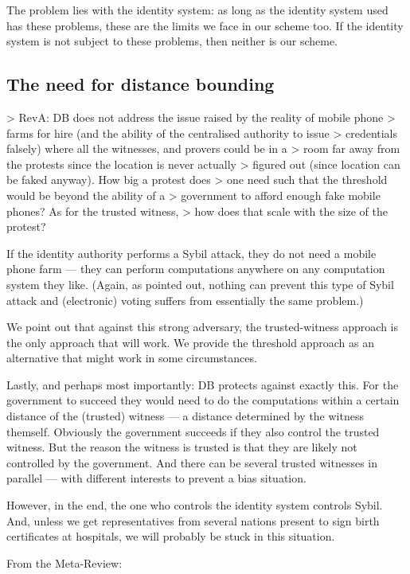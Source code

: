 The problem lies with the identity system: as long as the identity 
system used has these problems, these are the limits we face in our 
scheme too. If the identity system is not subject to these problems, 
then neither is our scheme.


\subsection{The need for distance bounding}

> RevA: DB does not address the issue raised by the reality of mobile phone
> farms for hire (and the ability of the centralised authority to issue
> credentials falsely) where all the witnesses, and provers could be in a
> room far away from the protests since the location is never actually
> figured out (since location can be faked anyway). How big a protest does
> one need such that the threshold would be beyond the ability of a
> government to afford enough fake mobile phones? As for the trusted witness,
> how does that scale with the size of the protest?

If the identity authority performs a Sybil attack, they 
do not need a mobile phone farm --- they can perform computations 
anywhere on any computation system they like. (Again, as pointed out, 
nothing can prevent this type of Sybil attack and (electronic) voting 
suffers from essentially the same problem.)

We point out that against this strong adversary, the 
trusted-witness approach is the only approach that will work. We provide 
the threshold approach as an alternative that might work in some 
circumstances.

Lastly, and perhaps most importantly: DB protects against exactly this. For 
the government to succeed they would need to do the computations within 
a certain distance of the (trusted) witness --- a distance determined by 
the witness themself. Obviously the government succeeds if they also 
control the trusted witness. But the reason the witness is trusted is 
that they are likely not controlled by the government. And there can be 
several trusted witnesses in parallel --- with different interests to 
prevent a bias situation.

However, in the end, the one who controls the identity system controls 
Sybil. And, unless we get representatives from several nations present 
to sign birth certificates at hospitals, we will probably be stuck in 
this situation. 

From the Meta-Review:
 
